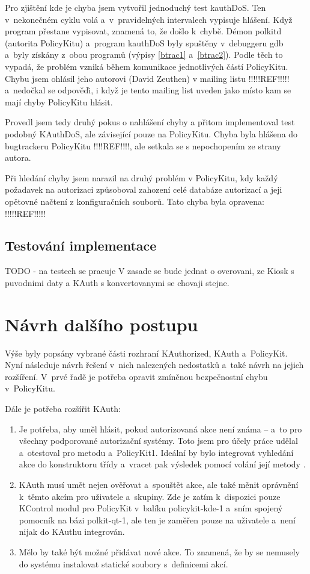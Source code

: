 Pro zjištění kde je chyba jsem vytvořil jednoduchý test kauthDoS. Ten v~nekonečném cyklu volá  a~v~pravidelných intervalech vypisuje hlášení. Když program přestane vypisovat, znamená to, že došlo k~chybě. Démon polkitd (autorita PolicyKitu) a~program kauthDoS byly spuštěny v~debuggeru gdb a~byly získány  z~obou programů (výpisy \ref{btrac1} a~\ref{btrac2}). Podle těch to vypadá, že problém vzniká během komunikace jednotlivých částí PolicyKitu. Chybu jsem ohlásil jeho autorovi (David Zeuthen) v mailing listu !!!!!REF!!!!! a~nedočkal se odpověďi, i když je tento mailing list uveden jako místo kam se mají chyby PolicyKitu hlásit.

Provedl jsem tedy druhý pokus o nahlášení chyby a přitom implementoval test podobný KAuthDoS, ale závisející pouze na PolicyKitu.
Chyba byla hlášena do bugtrackeru PolicyKitu !!!!REF!!!!, ale setkala se s nepochopením ze strany autora.

Při hledání chyby jsem narazil na druhý problém v PolicyKitu, kdy každý požadavek na autorizaci způsoboval zahození celé databáze autorizací a jeji opětovné načtení z konfiguračních souborů. Tato chyba byla opravena: !!!!!REF!!!!!

\subsection{Testování implementace}
TODO - na testech se pracuje
V zasade se bude jednat o overovani, ze Kiosk s puvodnimi daty a KAuth s konvertovanymi se chovaji stejne.


\section{Návrh dalšího postupu}
Výše byly popsány vybrané části rozhraní KAuthorized, KAuth a~PolicyKit. Nyní následuje návrh řešení v~nich nalezených nedostatků a~také návrh na jejich rozšíření. V~prvé řadě je potřeba opravit zmíněnou bezpečnostní chybu v~PolicyKitu.

Dále je potřeba rozšířit KAuth:
\begin{enumerate}
\item Je potřeba, aby uměl hlásit, pokud autorizovaná akce není známa -- a~to pro všechny podporované autorizační systémy. Toto jsem pro účely práce udělal a~otestoval pro metodu  a~PolicyKit1. Ideální by bylo integrovat vyhledání akce do konstruktoru třídy  a~vracet pak výsledek pomocí volání její metody .
\item KAuth musí umět nejen ověřovat a~spouštět akce, ale také měnit oprávnění k~těmto akcím pro uživatele a~skupiny. Zde je zatím k~dispozici pouze KControl modul pro PolicyKit v~balíku policykit-kde-1 a~sním spojený pomocník na bázi polkit-qt-1, ale ten je zaměřen pouze na uživatele a~není nijak do KAuthu integrován.
\item Mělo by také být možné přidávat nové akce. To znamená, že by se nemusely do systému instalovat statické soubory s~definicemi akcí.
\end{enumerate}

